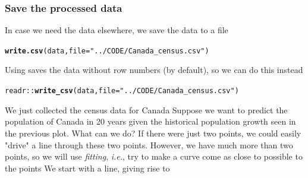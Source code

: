 \documentclass[aspectratio=169]{beamer}\usepackage[]{graphicx}\usepackage[]{xcolor}
\makeatletter
\newcommand{\hlsng}[1]{\textcolor[rgb]{0.192,0.494,0.8}{#1}}%
\newcommand{\hlopt}[1]{\textcolor[rgb]{0,0,0}{#1}}%
\newcommand{\hldef}[1]{\textcolor[rgb]{0.345,0.345,0.345}{#1}}%
\newcommand{\hlkwc}[1]{\textcolor[rgb]{0.333,0.667,0.333}{#1}}%
\newcommand{\hlkwd}[1]{\textcolor[rgb]{0.737,0.353,0.396}{\textbf{#1}}}%
\newenvironment{kframe}{%
 \def\at@end@of@kframe{}%
 \ifinner\ifhmode%
  \def\at@end@of@kframe{\end{minipage}}%
  \begin{minipage}{\columnwidth}%
 \fi\fi%
 \def\FrameCommand##1{\hskip\@totalleftmargin \hskip-\fboxsep
 \colorbox{shadecolor}{##1}\hskip-\fboxsep
     \hskip-\linewidth \hskip-\@totalleftmargin \hskip\columnwidth}%
 \MakeFramed {\advance\hsize-\width
   \@totalleftmargin\z@ \linewidth\hsize
   \@setminipage}}%
 {\par\unskip\endMakeFramed%
 \at@end@of@kframe}
\newenvironment{knitrout}{}{} %
\makeatother
\begin{document}
\begin{frame}[fragile]\frametitle{Save the processed data}
In case we need the data elsewhere, we save the data to a  file
\vfill
\begin{knitrout}
\color{fgcolor}\begin{kframe}
\begin{alltt}
\hlkwd{write.csv}\hldef{(data,} \hlkwc{file} \hldef{=} \hlsng{"../CODE/Canada_census.csv"}\hldef{)}
\end{alltt}
\end{kframe}
\end{knitrout}
\vfill
Using  saves the data without row numbers (by default), so we can do this instead
\vfill
\begin{knitrout}
\color{fgcolor}\begin{kframe}
\begin{alltt}
\hldef{readr}\hlopt{::}\hlkwd{write_csv}\hldef{(data,} \hlkwc{file} \hldef{=} \hlsng{"../CODE/Canada_census.csv"}\hldef{)}
\end{alltt}
\end{kframe}
\end{knitrout}
\end{frame}


\begin{frame}
We just collected the census data for Canada
\vfill
Suppose we want to predict the population of Canada in 20 years given the historical population growth seen in the previous plot. What can we do?
\vfill
If there were just two points, we could easily "drive" a line through these two points. However, we have much more than two points, so we will use \emph{fitting}, \emph{i.e.}, try to make a curve come as close to possible to the points
\vfill
We start with a line, giving rise to 
\end{frame}
\end{document}
